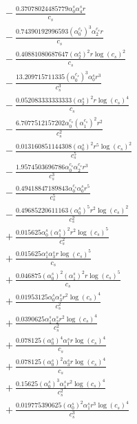 \documentclass[10pt]{article}
\begin{document}
\begin{align*}
&{}  - \frac{0.37078024485779 \alpha_{0}^s \alpha_{4}^s r}{c_{s}} \\
&{}  - \frac{0.74390192996593 \left(\alpha_{0}^{c_s}\right)^{3} \alpha_{2}^{c_s} r}{c_{s}} \\
&{}  - \frac{0.40881080687647 \left(\alpha_{2}^s\right)^{2} r \log{\left(c_{s} \right)}^{2}}{c_{s}} \\
&{}  - \frac{13.209715711335 \left(\alpha_{0}^{c_s}\right)^{3} \alpha_{0}^s r^{3}}{c_{s}^{3}} \\
&{}  - \frac{0.052083333333333 \left(\alpha_{2}^s\right)^{2} r \log{\left(c_{s} \right)}^{4}}{c_{s}} \\
&{}  - \frac{6.7077512157202 \alpha_{0}^{c_s} \left(\alpha_{1}^{c_s}\right)^{2} r^{2}}{c_{s}^{2}} \\
&{}  - \frac{0.013160851144308 \left(\alpha_{0}^s\right)^{2} r^{5} \log{\left(c_{s} \right)}^{2}}{c_{s}^{5}} \\
&{}  - \frac{1.9574503696786 \alpha_{0}^{c_s} \alpha_{2}^{c_s} r^{3}}{c_{s}^{3}} \\
&{}  - \frac{0.49418847189843 \alpha_{0}^{c_s} \alpha_{0}^s r^{5}}{c_{s}^{5}} \\
&{}  - \frac{0.49685220611163 \left(\alpha_{0}^s\right)^{5} r^{2} \log{\left(c_{s} \right)}^{2}}{c_{s}^{2}} \\
&{}  + \frac{0.015625 \alpha_{0}^s \left(\alpha_{1}^s\right)^{2} r^{2} \log{\left(c_{s} \right)}^{5}}{c_{s}^{2}} \\
&{}  + \frac{0.015625 \alpha_{1}^s \alpha_{3}^s r \log{\left(c_{s} \right)}^{5}}{c_{s}} \\
&{}  + \frac{0.046875 \left(\alpha_{0}^s\right)^{2} \left(\alpha_{1}^s\right)^{2} r \log{\left(c_{s} \right)}^{5}}{c_{s}} \\
&{}  + \frac{0.01953125 \alpha_{0}^s \alpha_{3}^s r^{2} \log{\left(c_{s} \right)}^{4}}{c_{s}^{2}} \\
&{}  + \frac{0.0390625 \alpha_{1}^s \alpha_{2}^s r^{2} \log{\left(c_{s} \right)}^{4}}{c_{s}^{2}} \\
&{}  + \frac{0.078125 \left(\alpha_{0}^s\right)^{4} \alpha_{1}^s r \log{\left(c_{s} \right)}^{4}}{c_{s}} \\
&{}  + \frac{0.078125 \left(\alpha_{0}^s\right)^{2} \alpha_{3}^s r \log{\left(c_{s} \right)}^{4}}{c_{s}} \\
&{}  + \frac{0.15625 \left(\alpha_{0}^s\right)^{3} \alpha_{1}^s r^{2} \log{\left(c_{s} \right)}^{4}}{c_{s}^{2}} \\
&{}  + \frac{0.019775390625 \left(\alpha_{0}^s\right)^{2} \alpha_{1}^s r^{3} \log{\left(c_{s} \right)}^{4}}{c_{s}^{3}} \\

\end{align*}
\end{document}
